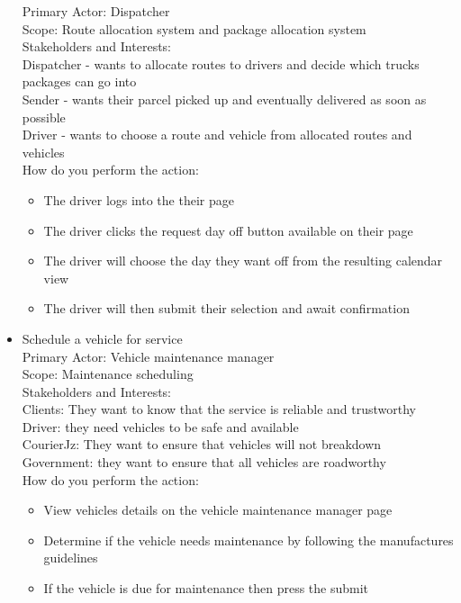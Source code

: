\documentclass[paper=a4, fontsize=11pt]{scrartcl} %
\numberwithin{equation}{section} %
\numberwithin{figure}{section} %
\numberwithin{table}{section} %
\begin{document}
\begin{itemize}
Primary Actor: \quad \quad Dispatcher \\
Scope:		\quad \quad	Route allocation system and package allocation system  \\
Stakeholders and Interests: \\
Dispatcher - wants to allocate routes to drivers and decide which trucks packages can go into \\
Sender - wants their parcel picked up and eventually delivered as soon as possible \\
Driver - wants to choose a route and vehicle from allocated routes and vehicles \\
How do you perform the action: \\
\begin{itemize}
\item The driver logs into the their page
\item The driver clicks the request day off button available on their page
\item The driver will choose the day they want off from the resulting calendar view 
\item The driver will then submit their selection and await confirmation 
\end{itemize}

\item Schedule a vehicle for service\\

Primary Actor: \quad \quad Vehicle maintenance manager \\
Scope:		\quad \quad	Maintenance scheduling  \\
Stakeholders and Interests: \\
 Clients: They want to know that the service is reliable and trustworthy\\
 Driver: they need vehicles to be safe and available\\
 CourierJz: They want to ensure that vehicles will not breakdown\\
 Government: they want to ensure that all vehicles are roadworthy\\
How do you perform the action: \\
\begin{itemize}
\item View vehicles details on the vehicle maintenance manager page
\item Determine if the vehicle needs maintenance by following the manufactures guidelines
\item If the vehicle is due for maintenance then press the submit
\end{itemize}


\end{itemize}
\end{document}
